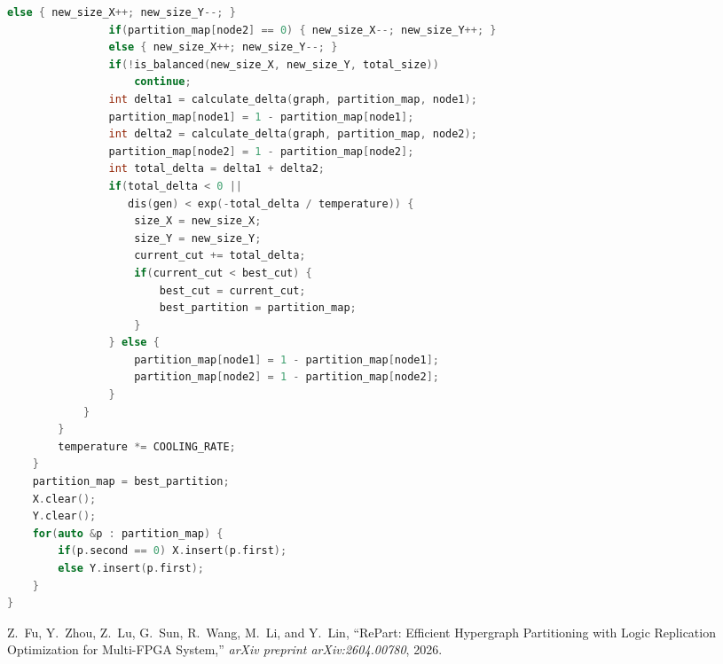 \documentclass{SYSUReport}
\begin{document}
\begin{lstlisting}[language=C++, caption=模拟退火算法solution.cpp]
                else { new_size_X++; new_size_Y--; }
                if(partition_map[node2] == 0) { new_size_X--; new_size_Y++; }
                else { new_size_X++; new_size_Y--; }
                if(!is_balanced(new_size_X, new_size_Y, total_size))
                    continue;
                int delta1 = calculate_delta(graph, partition_map, node1);
                partition_map[node1] = 1 - partition_map[node1];
                int delta2 = calculate_delta(graph, partition_map, node2);
                partition_map[node2] = 1 - partition_map[node2];
                int total_delta = delta1 + delta2;
                if(total_delta < 0 ||
                   dis(gen) < exp(-total_delta / temperature)) {
                    size_X = new_size_X;
                    size_Y = new_size_Y;
                    current_cut += total_delta;
                    if(current_cut < best_cut) {
                        best_cut = current_cut;
                        best_partition = partition_map;
                    }
                } else {
                    partition_map[node1] = 1 - partition_map[node1];
                    partition_map[node2] = 1 - partition_map[node2];
                }
            }
        }
        temperature *= COOLING_RATE;
    }
    partition_map = best_partition;
    X.clear();
    Y.clear();
    for(auto &p : partition_map) {
        if(p.second == 0) X.insert(p.first);
        else Y.insert(p.first);
    }
}
\end{lstlisting}

\begin{thebibliography}{9}

Z.~Fu, Y.~Zhou, Z.~Lu, G.~Sun, R.~Wang, M.~Li, and Y.~Lin,
\newblock ``RePart: Efficient Hypergraph Partitioning with Logic Replication Optimization for Multi-FPGA System,''
\newblock \textit{arXiv preprint arXiv:2604.00780}, 2026.

\end{thebibliography}
\end{document}
